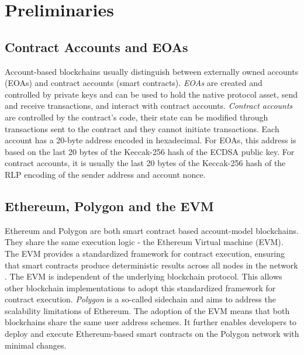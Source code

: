 \documentclass[12pt,a4paper,titlepage,oneside,english]{article}
\begin{document}

\section{Preliminaries}
\subsection{Contract Accounts and EOAs}
Account-based blockchains usually distinguish between externally owned accounts (EOAs) and contract accounts (smart contracts). \textit{EOAs} are created and controlled by private keys and can be used to hold the native protocol asset, send and receive transactions, and interact with contract accounts. \textit{Contract accounts} are controlled by the contract's code, their state can be modified through transactions sent to the contract and they cannot initiate transactions. \citep{buterin2014ethereum} \newline Each account has a 20-byte address encoded in hexadecimal. For EOAs, this address is based on the last 20 bytes of the Keccak-256 hash of the ECDSA public key. For contract accounts, it is usually the last 20 bytes of the Keccak-256 hash of the RLP encoding of the sender address and account nonce. \citep{GW:14}

\subsection{Ethereum, Polygon and the EVM}
Ethereum and Polygon are both smart contract based account-model blockchains. They share the same execution logic - the Ethereum Virtual machine (EVM).
The EVM provides a standardized framework for contract execution, ensuring that smart contracts produce deterministic results across all nodes in the network \citep{GW:14}. The EVM is independent of the underlying blockchain protocol. This allows other blockchain implementations to adopt this standardized framework for contract execution.\newline
\textit{Polygon} is a so-called sidechain and aims to address the scalability limitations of Ethereum. The adoption of the EVM means that both blockchains share the same user address schemes. It further enables developers to deploy and execute Ethereum-based smart contracts on the Polygon network with minimal changes. \citep{matic_whitepaper}
\end{document}
